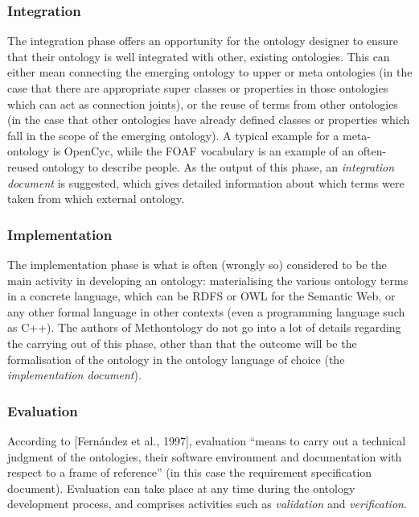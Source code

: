 \documentclass{article}
\begin{document}
\subsubsection{Integration} %
\label{ssub:integration}

The integration phase offers an opportunity for the ontology designer to ensure that their ontology is well integrated with other, existing ontologies. This can either mean connecting the emerging ontology to upper or meta ontologies (in the case that there are appropriate super classes or properties in those ontologies which can act as connection joints), or the reuse of terms from other ontologies (in the case that other ontologies have already defined classes or properties which fall in the scope of the emerging ontology). A typical example for a meta-ontology is OpenCyc, while the FOAF vocabulary \cite{brickley2004foaf} is an example of an often-reused ontology to describe people. As the output of this phase, an \emph{integration document} is suggested, which gives detailed information about which terms were taken from which external ontology.

\subsubsection{Implementation} %
\label{ssub:implementation}

The implementation phase is what is often (wrongly so) considered to be the main activity in developing an ontology: materialising the various ontology terms in a concrete language, which can be RDFS or OWL for the Semantic Web, or any other formal language in other contexts (even a programming language such as C++). The authors of Methontology do not go into a lot of details regarding the carrying out of this phase, other than that the outcome will be the formalisation of the ontology in the ontology language of choice (the \emph{implementation document}).

\subsubsection{Evaluation} %
\label{ssub:evaluation}

According to [Fernández et  al., 1997], evaluation ``means to carry out a technical judgment of the ontologies, their software environment and documentation with respect to a frame of reference'' (in this case the requirement specification document). Evaluation can take place at any time during the ontology development process, and comprises activities such as \emph{validation} and \emph{verification}.
\end{document}
